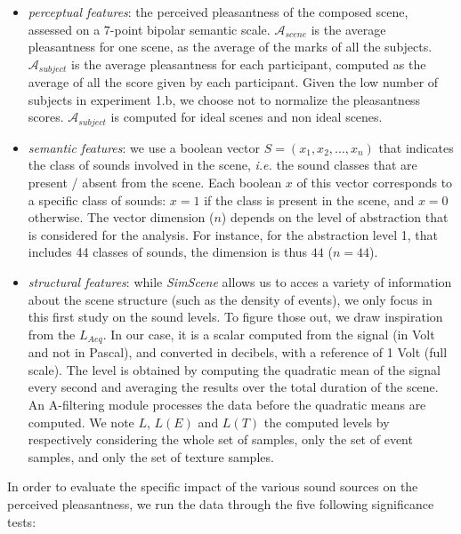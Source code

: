 \documentclass[12pt]{elsarticle}
\begin{document}
\begin{itemize}
\item \emph{perceptual features}: the perceived pleasantness of the composed scene, assessed on a 7-point bipolar semantic scale. $\mathcal{A}_{scene}$ is the average pleasantness for one scene, as the average of the marks of all the subjects. $\mathcal{A}_{subject}$ is the average pleasantness for each participant, computed as the average of all the score given by each participant. Given the low number of subjects in experiment 1.b, we choose not to normalize the pleasantness scores. $\mathcal{A}_{subject}$ is computed for ideal scenes and non ideal scenes.

\item \emph{semantic features}: we use a boolean vector $S = (x_1, x_2, \ldots, x_n)$ that indicates the class of sounds involved in the scene, \textit{i.e.} the sound classes that are present / absent from the scene. Each boolean $x$ of this vector corresponds to a specific class of sounds: $x = 1$ if the class is present in the scene, and $x = 0$ otherwise. The vector dimension ($n$) depends on the level of abstraction that is considered for the analysis. For instance, for the abstraction level 1, that includes 44 classes of sounds, the dimension is thus $44$ ($n = 44$).

\item \emph{structural features}: while \emph{SimScene} allows us to acces a variety of information about the scene structure (such as the density of events), we only focus in this first study on the sound levels. To figure those out, we draw inspiration from the $L_{Aeq}$. In our case, it is a scalar computed from the  signal (in Volt and not in Pascal), and converted in decibels, with a reference of 1 Volt (full scale). The level is obtained by computing the quadratic mean of the signal every second and averaging the results over the total duration of the scene. An A-filtering module processes the data before the quadratic means are computed. We note $L$, $L(E)$ and $L(T)$ the computed levels by respectively considering the whole set of samples, only the set of event samples, and only the set of texture samples.
\end{itemize}


In order to evaluate the specific impact of the various sound sources on the perceived pleasantness, we run the data through the five following significance tests:
\end{document}
